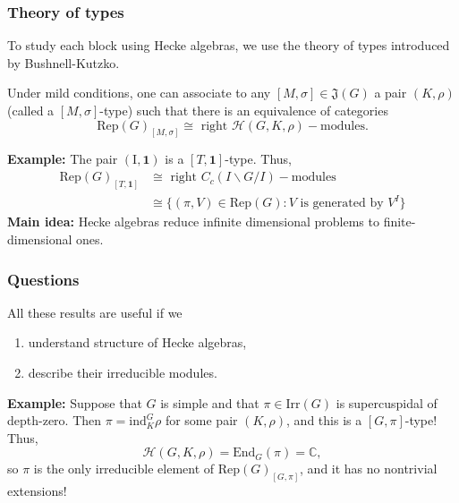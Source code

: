 \documentclass{beamer}
\newcommand{\Rep}{\mathrm{Rep}}
\newcommand{\Irr}{\mathrm{Irr}}
\newcommand{\End}{\mathrm{End}}
\newcommand{\ind}{\mathrm{ind}}
\newcommand{\CC}{\mathbb{C}}
\newcommand{\cH}{\mathcal{H}}
\theoremstyle{plain}
\begin{document}
\begin{frame}
    \frametitle{Theory of types}
    To study each block using Hecke algebras, we use the theory of types introduced by Bushnell-Kutzko.\pause

    \begin{theorem}
        Under mild conditions, one can associate to any $[M,\sigma]\in\mathfrak{J}(G)$ a pair $(K,\rho)$ (called a $[M,\sigma]$-type) such that there is an equivalence of categories
        \[ \Rep(G)_{[M,\sigma]}\cong\text{ right }\cH(G,K,\rho)-\text{modules}.\]
    \end{theorem}\pause

    \textbf{Example:} The pair $(\text{I},\mathbf{1})$ is a $[T,\mathbf{1}]$-type. \pause
    Thus, 
    \begin{align*}
        \Rep(G)_{[T,\mathbf{1}]}&\cong\text{ right }C_c(I\backslash G/I)-\text{modules}\\ 
        &\cong\{(\pi,V)\in\Rep(G):V\text{ is generated by }V^I\}
    \end{align*}\pause
    \textbf{Main idea:} Hecke algebras reduce infinite dimensional problems to finite-dimensional ones.
   
\end{frame}

\iffalse
\begin{frame}
    \frametitle{Examples}
    \textbf{Example:} $\cH(G,K,\mathbf{1})\cong C_c(K\backslash G/K)$ with the convolution product. There is a bijection
    \[\{(\pi,V)\in\Irr(G):V^K\neq 0\}\longleftrightarrow \text{ irreducible }C_c(K\backslash G/K) \text{-mod.}\]
    \vspace{0.5cm}
\end{frame}
\fi

\begin{frame}
    \frametitle{Questions}
    All these results are useful if we \pause
    \begin{enumerate}
        \item understand structure of Hecke algebras, \pause
        \item describe their irreducible modules. \pause
    \end{enumerate}
    \vspace{0.5cm}
    \textbf{Example:} Suppose that $G$ is simple and that $\pi\in\Irr(G)$ is supercuspidal of depth-zero. \pause
    Then $\pi=\ind_K^G\rho$ for some pair $(K,\rho)$, and this is a $[G,\pi]$-type! \pause
    Thus,
    \[\cH(G,K,\rho)=\End_G(\pi)=\CC,\]
    so $\pi$ is the only irreducible element of $\Rep(G)_{[G,\pi]}$, and it has no nontrivial extensions!
\end{frame}
\end{document}
